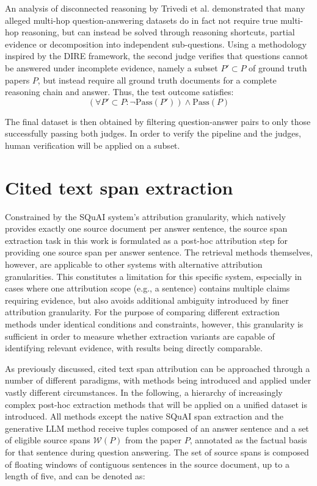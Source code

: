 An analysis of disconnected reasoning by Trivedi et al. \cite{isMultihopInDireCondition} demonstrated that many alleged multi-hop question-answering datasets do in fact not require true multi-hop reasoning, but can instead be solved through reasoning shortcuts, partial evidence or decomposition into independent sub-questions. Using a methodology inspired by the DIRE \cite{isMultihopInDireCondition} framework, the second judge verifies that questions cannot be answered under incomplete evidence, namely a subset $P' \subset P$ of ground truth papers $P$, but instead require all ground truth documents for a complete reasoning chain and answer. Thus, the test outcome satisfies: $$\left( \forall P' \subset P : \neg\text{Pass}(P') \right) \land \text{Pass}(P)$$

The final dataset is then obtained by filtering question-answer pairs to only those successfully passing both judges. In order to verify the pipeline and the judges, human verification will be applied on a subset.


\section{Cited text span extraction}
Constrained by the SQuAI system's attribution granularity, which natively provides exactly one source document per answer sentence, the source span extraction task in this work is formulated as a post-hoc attribution step for providing one source span per answer sentence. The retrieval methods themselves, however, are applicable to other systems with alternative attribution granularities.
This constitutes a limitation for this specific system, especially in cases where one attribution scope (e.g., a sentence) contains multiple claims requiring evidence, but also avoids additional ambiguity introduced by finer attribution granularity. For the purpose of comparing different extraction methods under identical conditions and constraints, however, this granularity is sufficient in order to measure whether extraction variants are capable of identifying relevant evidence, with results being directly comparable. 

As previously discussed, cited text span attribution can be approached through a number of different paradigms, with methods being introduced and applied under vastly different circumstances. In the following, a hierarchy of increasingly complex post-hoc extraction methods that will be applied on a unified dataset is introduced. All methods except the native SQuAI span extraction and the generative LLM method receive tuples composed of an answer sentence and a set of eligible source spans $\mathcal{W}(P)$ from the paper $P$, annotated as the factual basis for that sentence during question answering. The set of source spans is composed of floating windows of contiguous sentences in the source document, up to a length of five, and can be denoted as: 

